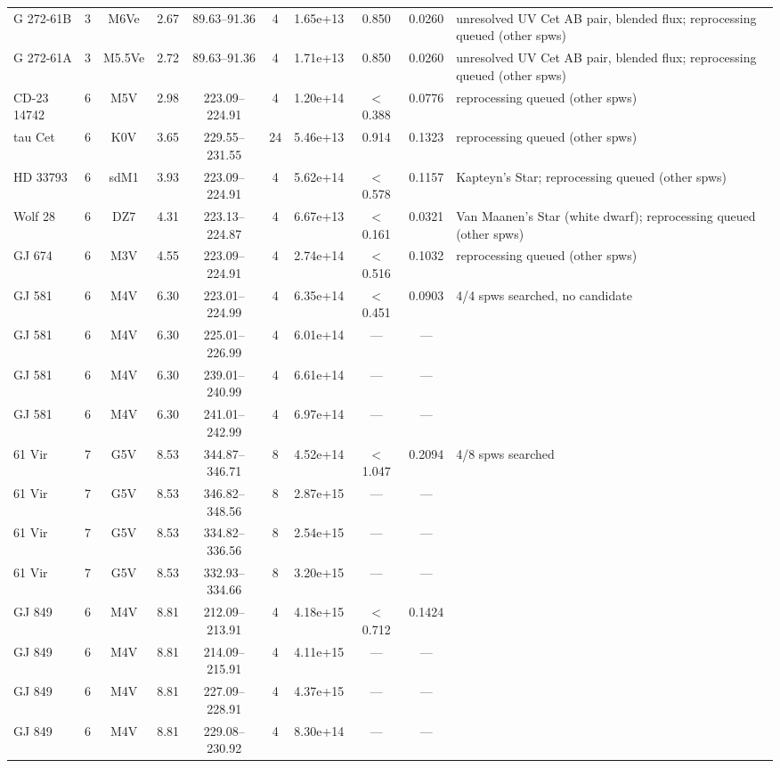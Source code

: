\documentclass{openjournal}
\begin{document}
\begin{table}
\begin{tabularx}{\textwidth}{@{}l c c c c c c c c X@{}}
G 272-61B & 3 & M6Ve & 2.67 & 89.63--91.36 & 4 & 1.65e+13 & 0.850 & 0.0260 & unresolved UV Cet AB pair, blended flux; reprocessing queued (other spws) \\
G 272-61A & 3 & M5.5Ve & 2.72 & 89.63--91.36 & 4 & 1.71e+13 & 0.850 & 0.0260 & unresolved UV Cet AB pair, blended flux; reprocessing queued (other spws) \\
CD-23 14742 & 6 & M5V & 2.98 & 223.09--224.91 & 4 & 1.20e+14 & $<$0.388 & 0.0776 & reprocessing queued (other spws) \\
tau Cet & 6 & K0V & 3.65 & 229.55--231.55 & 24 & 5.46e+13 & 0.914 & 0.1323 & reprocessing queued (other spws) \\
HD 33793 & 6 & sdM1 & 3.93 & 223.09--224.91 & 4 & 5.62e+14 & $<$0.578 & 0.1157 & Kapteyn's Star; reprocessing queued (other spws) \\
Wolf   28 & 6 & DZ7 & 4.31 & 223.13--224.87 & 4 & 6.67e+13 & $<$0.161 & 0.0321 & Van Maanen's Star (white dwarf); reprocessing queued (other spws) \\
GJ 674 & 6 & M3V & 4.55 & 223.09--224.91 & 4 & 2.74e+14 & $<$0.516 & 0.1032 & reprocessing queued (other spws) \\
GJ 581 & 6 & M4V & 6.30 & 223.01--224.99 & 4 & 6.35e+14 & $<$0.451 & 0.0903 & 4/4 spws searched, no candidate \\
GJ 581 & 6 & M4V & 6.30 & 225.01--226.99 & 4 & 6.01e+14 & --- & --- & \\
GJ 581 & 6 & M4V & 6.30 & 239.01--240.99 & 4 & 6.61e+14 & --- & --- & \\
GJ 581 & 6 & M4V & 6.30 & 241.01--242.99 & 4 & 6.97e+14 & --- & --- & \\
61 Vir & 7 & G5V & 8.53 & 344.87--346.71 & 8 & 4.52e+14 & $<$1.047 & 0.2094 & 4/8 spws searched \\
61 Vir & 7 & G5V & 8.53 & 346.82--348.56 & 8 & 2.87e+15 & --- & --- &  \\
61 Vir & 7 & G5V & 8.53 & 334.82--336.56 & 8 & 2.54e+15 & --- & --- &  \\
61 Vir & 7 & G5V & 8.53 & 332.93--334.66 & 8 & 3.20e+15 & --- & --- &  \\
GJ 849 & 6 & M4V & 8.81 & 212.09--213.91 & 4 & 4.18e+15 & $<$0.712 & 0.1424 &  \\
GJ 849 & 6 & M4V & 8.81 & 214.09--215.91 & 4 & 4.11e+15 & --- & --- &  \\
GJ 849 & 6 & M4V & 8.81 & 227.09--228.91 & 4 & 4.37e+15 & --- & --- &  \\
GJ 849 & 6 & M4V & 8.81 & 229.08--230.92 & 4 & 8.30e+14 & --- & --- &  \\
\hline
\end{tabularx}
\end{table}
\end{document}
